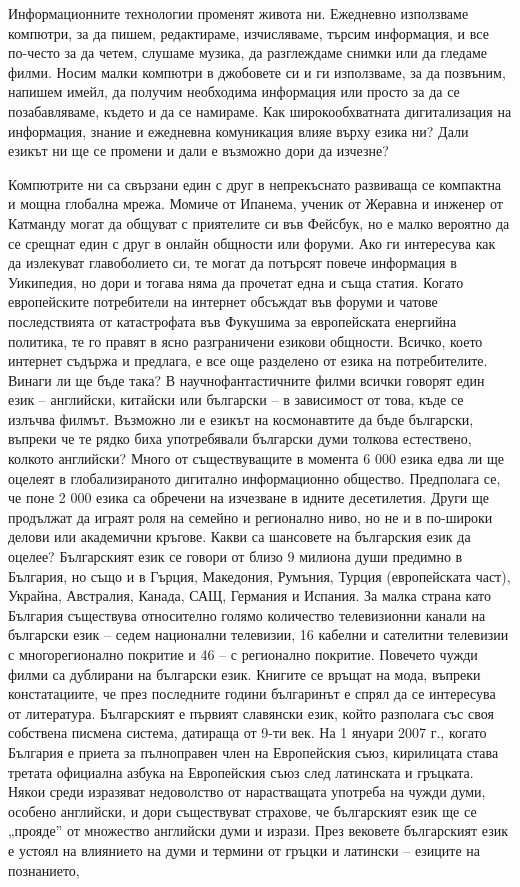 \begin{multicols}{2}
  Информационните технологии променят живота ни. Ежедневно използваме компютри, за да пишем, редактираме, изчисляваме, търсим информация, и все по-често за да четем, слушаме музика, да разглеждаме снимки или да гледаме филми. Носим малки компютри в джобовете си и ги използваме, за да позвъним, напишем имейл, да получим необходима информация или просто за да се позабавляваме, където и да се намираме. Как широкообхватната дигитализация на информация, знание и ежедневна комуникация влияе върху езика ни? Дали езикът ни ще се промени и дали е възможно дори да изчезне?

  Компютрите ни са свързани един с друг в непрекъснато развиваща се компактна и мощна глобална мрежа. Момиче от Ипанема, ученик от Жеравна и инженер от Катманду могат да общуват с приятелите си във Фейсбук, но е малко вероятно да се срещнат един с друг в онлайн общности или форуми. Ако ги интересува как да излекуват главоболието си, те могат да потърсят повече информация в Уикипедия, но дори и тогава няма да прочетат една и съща статия. Когато европейските потребители на интернет обсъждат във форуми и чатове последствията от катастрофата във Фукушима за европейската енергийна политика, те го правят в ясно разграничени езикови общности. Всичко, което интернет съдържа и предлага, е все още разделено от езика на потребителите. Винаги ли ще бъде така?  В научнофантастичните филми всички говорят един език – английски, китайски или български – в зависимост от това, къде се излъчва филмът. Възможно ли е езикът на космонавтите да бъде български, въпреки че те рядко биха употребявали български думи толкова естествено, колкото английски? Много от съществуващите в момента 6 000 езика едва ли ще оцелеят в глобализираното дигитално информационно общество. Предполага се, че поне 2 000 езика са обречени на изчезване в идните десетилетия. Други ще продължат да играят роля на семейно и регионално ниво, но не и в по-широки делови или академични кръгове. Какви са шансовете на българския език да оцелее?  Българският език се говори от близо 9 милиона души предимно в България, но също и в Гърция, Македония, Румъния, Турция (европейската част), Украйна, Австралия, Канада, САЩ, Германия и Испания. За малка страна като България съществува относително голямо количество телевизионни канали на български език -- седем национални телевизии, 16 кабелни и сателитни телевизии с многорегионално покритие и 46 -- с регионално покритие.  Повечето чужди филми са дублирани на български език. Книгите се връщат на мода, въпреки констатациите, че през последните години българинът е спрял да се интересува от литература.  Българският е първият славянски език, който разполага със своя собствена писмена система, датираща от 9-ти век. На 1 януари 2007 г., когато България е приета за пълноправен член на Европейския съюз, кирилицата става третата официална азбука на Европейския съюз след латинската и гръцката.  Някои среди изразяват недоволство от нарастващата употреба на чужди думи, особено английски, и дори съществуват страхове, че българският език ще се „прояде” от множество английски думи и изрази. През вековете българският език е устоял на влиянието на думи и термини от гръцки и латински – езиците на познанието, 
\end{multicols}
